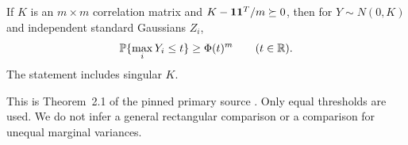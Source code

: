 \begin{prior}
\label{prior:max}
If $K$ is an $m\times m$ correlation matrix and
$K-\mathbf 1\mathbf 1^T/m\succeq0$, then for $Y\sim N(0,K)$ and independent
standard Gaussians $Z_i$,
\[
                 \mathbb P\{\max_iY_i\le t\}\ge\Phi(t)^m
                 \qquad(t\in\mathbb R).
\]
The statement includes singular $K$.
\end{prior}
This is Theorem~2.1 of the pinned primary source \cite{Mulgund}. Only
equal thresholds are used. We do not infer a general rectangular
comparison or a comparison for unequal marginal variances.


